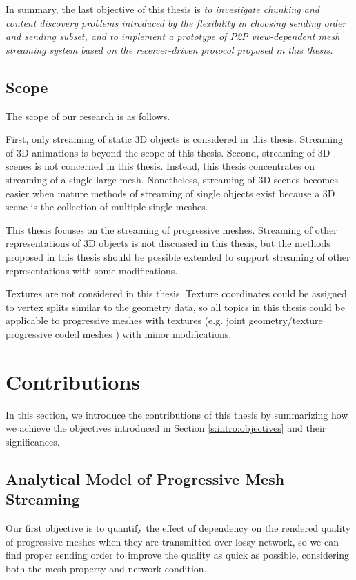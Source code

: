     In summary, the last objective of this thesis is 
    \textit{
            to investigate chunking and content discovery problems introduced by 
            the flexibility in choosing sending order and sending subset, and
            to implement a prototype of P2P view-dependent mesh streaming system
            based on the receiver-driven protocol proposed in this thesis.
            }
    
    \subsection{Scope}
            The scope of our research is as follows.

            First, only streaming of static 3D objects is considered in this thesis. 
            Streaming of 3D animations is beyond the scope of this thesis. 
            Second, streaming of 3D scenes is not concerned in this thesis.
            Instead, this thesis concentrates on streaming of a single large mesh.
            Nonetheless, streaming of 3D scenes becomes easier when mature methods
            of streaming of single objects exist because a 3D scene is the collection
            of multiple single meshes.
            
            This thesis focuses on the streaming of progressive meshes. 
            Streaming of other representations of 3D objects is not discussed in this thesis,
            but the methods proposed in this thesis should be possible
            extended to support streaming of other representations with some modifications.
            
            Textures are not considered in this thesis. Texture coordinates could be assigned
            to vertex splits similar to the geometry data, so all topics in this thesis could
            be applicable to progressive meshes with textures (e.g. joint geometry/texture progressive coded meshes 
            \cite{joint:okuda}) with minor modifications. 
  \section{Contributions}
  \label{s:intro:contributions}
    In this section, we introduce the contributions of this thesis by
    summarizing how we achieve the objectives introduced in 
    Section \ref{s:intro:objectives} and their significances.
    
    \subsection{Analytical Model of Progressive Mesh Streaming}
    Our first objective is to quantify the effect of dependency
    on the rendered quality of progressive meshes when they are
    transmitted over lossy network, so we can find proper sending
    order to improve the quality as quick as possible,
    considering both the mesh property and network condition. 
            
